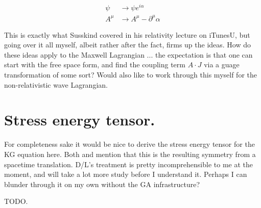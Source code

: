 \documentclass{article}
\begin{document}
\begin{align*}
\psi &\rightarrow \psi e^{i\alpha} \\
A^\mu &\rightarrow A^\mu - \partial^\mu \alpha 
\end{align*}

This is exactly what Susskind covered in his relativity lecture on iTunesU, but going over it all myself, albeit rather after the fact, firms up the ideas.  How
do these ideas apply to the Maxwell Lagrangian ... the expectation is that one can start with the free space form, and find the coupling term $A \cdot J$ via a
guage transformation of some sort?  Would also like to work through this myself for the non-relativistic wave Lagrangian.

\section{ Stress energy tensor. }

For completeness sake it would be nice to derive the stress energy tensor
for the KG equation here.  Both \cite{srednicki2007qft} and \cite{doran2003gap} mention that this is the resulting symmetry from
a spacetime translation.  D/L's treatment is pretty incomprehensible to me 
at the moment, and will take a lot more study before I understand
it.  Perhaps I can blunder through it on my own without the GA infrastructure?

TODO.



\end{document}
